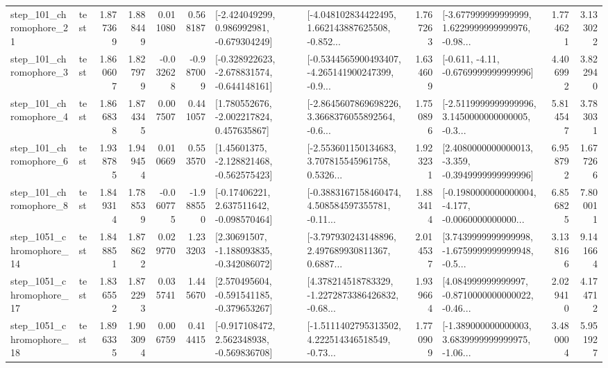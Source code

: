 \begin{tabular}{llrrrrllrlrr}
  step\_101\_chromophore\_21 &      test &      1.877369 &    1.888449 &      0.011080 &  0.568187 &   [-2.424049299, 0.986992981, -0.679304249] &  [-4.048102834422495, 1.662143887625508, -0.852... &       1.767263 &  [-3.677999999999999, 1.6229999999999976, -0.98... &            1.774621 &          3.133022 \\
   step\_101\_chromophore\_3 &      test &      1.860607 &    1.827979 &     -0.032628 & -0.987009 &  [-0.328922623, -2.678831574, -0.644148161] &  [-0.5344565900493407, -4.265141900247399, -0.9... &       1.634609 &               [-0.611, -4.11, -0.6769999999999996] &            4.406992 &          3.822940 \\
   step\_101\_chromophore\_4 &      test &      1.866838 &    1.874345 &      0.007507 &  0.441057 &    [1.780552676, -2.002217824, 0.457635867] &  [-2.8645607869698226, 3.3668376055892564, -0.6... &       1.750896 &  [-2.5119999999999996, 3.1450000000000005, -0.3... &            5.814547 &          3.783031 \\
   step\_101\_chromophore\_6 &      test &      1.938785 &    1.949454 &      0.010669 &  0.553570 &    [1.45601375, -2.128821468, -0.562575423] &  [-2.553601150134683, 3.707815545961758, 0.5326... &       1.923231 &  [2.4080000000000013, -3.359, -0.3949999999999996] &            6.958792 &          1.677266 \\
   step\_101\_chromophore\_8 &      test &      1.849314 &    1.788539 &     -0.060775 & -1.988550 &    [-0.17406221, 2.637511642, -0.098570464] &  [-0.3883167158460474, 4.508584597355781, -0.11... &       1.883414 &  [-0.1980000000000004, -4.177, -0.0060000000000... &            6.856825 &          7.800011 \\
 step\_1051\_chromophore\_14 &      test &      1.848851 &    1.878622 &      0.029770 &  1.233203 &    [2.30691507, -1.188093835, -0.342086072] &  [-3.797930243148896, 2.497689930811367, 0.6887... &       2.014537 &  [3.7439999999999998, -1.6759999999999948, -0.5... &            3.138166 &          9.141664 \\
 step\_1051\_chromophore\_17 &      test &      1.836552 &    1.872293 &      0.035741 &  1.445670 &   [2.570495604, -0.591541185, -0.379653267] &  [4.378214518783329, -1.2272873386426832, -0.68... &       1.939664 &  [4.084999999999997, -0.8710000000000022, -0.46... &            2.029410 &          4.174712 \\
 step\_1051\_chromophore\_18 &      test &      1.896335 &    1.903094 &      0.006759 &  0.414415 &   [-0.917108472, 2.562348938, -0.569836708] &  [-1.5111402795313502, 4.222514346518549, -0.73... &       1.770909 &  [-1.389000000000003, 3.6839999999999975, -1.06... &            3.480004 &          5.951927 \\

\end{tabular}
